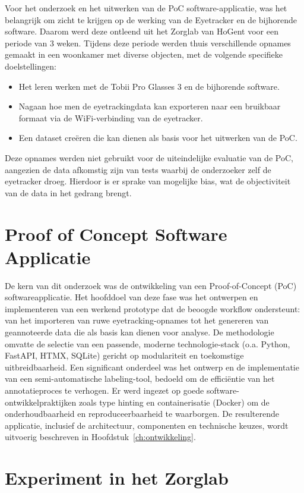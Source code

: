 Voor het onderzoek en het uitwerken van de PoC software-applicatie, was het belangrijk om zicht te krijgen op de werking van de Eyetracker en de bijhorende software.
Daarom werd deze ontleend uit het Zorglab van HoGent voor een periode van 3 weken. 
Tijdens deze periode werden thuis verschillende opnames gemaakt in een woonkamer met diverse objecten, met de volgende specifieke doelstellingen:
\begin{itemize}
    \item Het leren werken met de Tobii Pro Glasses 3 en de bijhorende software.
    \item Nagaan hoe men de eyetrackingdata kan exporteren naar een bruikbaar formaat via de WiFi-verbinding van de eyetracker.
    \item Een dataset creëren die kan dienen als basis voor het uitwerken van de PoC.
\end{itemize}
Deze opnames werden niet gebruikt voor de uiteindelijke evaluatie van de PoC, aangezien de data afkomstig zijn van tests waarbij de onderzoeker zelf de eyetracker droeg.
Hierdoor is er sprake van mogelijke bias, wat de objectiviteit van de data in het gedrang brengt.

\section{Proof of Concept Software Applicatie}

De kern van dit onderzoek was de ontwikkeling van een Proof-of-Concept (PoC) softwareapplicatie. 
Het hoofddoel van deze fase was het ontwerpen en implementeren van een werkend prototype dat de beoogde workflow ondersteunt: van het importeren van ruwe eyetracking-opnames tot het genereren van geannoteerde data die als basis kan dienen voor analyse. 
De methodologie omvatte de selectie van een passende, moderne technologie-stack (o.a. Python, FastAPI, HTMX, SQLite) gericht op modulariteit en toekomstige uitbreidbaarheid. 
Een significant onderdeel was het ontwerp en de implementatie van een semi-automatische labeling-tool, bedoeld om de efficiëntie van het annotatieproces te verhogen. 
Er werd ingezet op goede software-ontwikkelpraktijken zoals type hinting en containerisatie (Docker) om de onderhoudbaarheid en reproduceerbaarheid te waarborgen. 
De resulterende applicatie, inclusief de architectuur, componenten en technische keuzes, wordt uitvoerig beschreven in Hoofdstuk~\ref{ch:ontwikkeling}.

\section{Experiment in het Zorglab}

